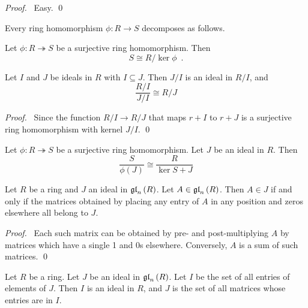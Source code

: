 \begin{proof}
\pf\ Easy. \qed
\end{proof}

\begin{cor}
Every ring homomorphism $\phi : R \rightarrow S$ decomposes as follows.

\begin{center}
\end{center}
\end{cor}

\begin{cor}
Let $\phi : R \twoheadrightarrow S$ be a surjective ring homomorphism. Then
\[ S \cong R / \ker \phi \enspace . \]
\end{cor}

\begin{thm}
Let $I$ and $J$ be ideals in $R$ with $I \subseteq J$. Then $J/I$ is an ideal in $R/I$, and
\[ \frac{R/I}{J/I} \cong R/J \]
\end{thm}

\begin{proof}
\pf\ Since the function $R/I \rightarrow R/J$ that maps $r + I$ to $r + J$ is a surjective ring homomorphism with kernel $J/I$. \qed
\end{proof}

\begin{cor}
Let $\phi : R \twoheadrightarrow S$ be a surjective ring homomorphism. Let $J$ be an ideal in $R$. Then
\[ \frac{S}{\phi(J)} \cong \frac{R}{\ker S + J} \]
\end{cor}

\begin{prop}
Let $R$ be a ring and $J$ an ideal in $\mathfrak{gl}_{n} \left( {R} \right)$. Let $A \in \mathfrak{gl}_{n} \left( {R} \right)$. Then $A \in J$ if and only if the matrices obtained by placing any entry of $A$ in any position and zeros elsewhere all belong to $J$.
\end{prop}

\begin{proof}
\pf\ Each such matrix can be obtained by pre- and post-multiplying $A$ by matrices which have a single 1 and 0s elsewhere. Conversely, $A$ is a sum of such matrices. \qed
\end{proof}

\begin{cor}
\label{cor:ideals-in-glnR}
Let $R$ be a ring. Let $J$ be an ideal in $\mathfrak{gl}_{n} \left( {R} \right)$. Let $I$ be the set of all entries of elements of $J$. Then $I$ is an ideal in $R$, and $J$ is the set of all matrices whose entries are in $I$.
\end{cor}

